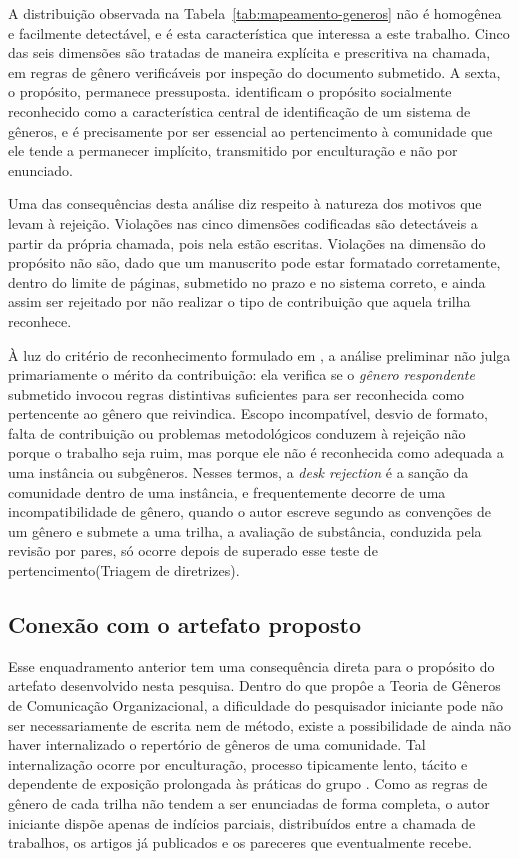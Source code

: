 A distribuição observada na Tabela~\ref{tab:mapeamento-generos} não é homogênea e facilmente detectável, e é esta característica que interessa a este trabalho. Cinco das seis dimensões são tratadas de maneira explícita e prescritiva na chamada, em regras de gênero verificáveis por inspeção do documento submetido. A sexta, o propósito, permanece pressuposta. \citeauthor{GenreSystems} identificam o propósito socialmente reconhecido como a característica central de identificação de um sistema de gêneros, e é precisamente por ser essencial ao pertencimento à comunidade que ele tende a permanecer implícito, transmitido por enculturação e não por enunciado.
 
Uma das consequências desta análise diz respeito à natureza dos motivos que levam à rejeição. Violações nas cinco dimensões codificadas são detectáveis a partir da própria chamada, pois nela estão escritas. Violações na dimensão do propósito não são, dado que um manuscrito pode estar formatado corretamente, dentro do limite de páginas, submetido no prazo e no sistema correto, e ainda assim ser rejeitado por não realizar o tipo de contribuição que aquela trilha reconhece. 

 À luz do critério de reconhecimento formulado em \cite{GenresOrgComm}, a análise preliminar não julga primariamente o mérito da contribuição: ela verifica se o \emph{gênero respondente} submetido invocou regras distintivas suficientes para ser reconhecida como pertencente ao gênero que reivindica. Escopo incompatível, desvio de formato, falta de contribuição ou problemas metodológicos conduzem à rejeição não porque o trabalho seja ruim, mas porque ele não é reconhecida como adequada a uma instância ou subgêneros. Nesses termos, a \emph{desk rejection} é a sanção da comunidade dentro de uma instância, e frequentemente decorre de uma incompatibilidade de gênero, quando o autor escreve segundo as convenções de um gênero e submete a uma trilha, a avaliação de substância, conduzida pela revisão por pares, só ocorre depois de superado esse teste de pertencimento(Triagem de diretrizes).


\subsection{Conexão com o artefato proposto}

Esse enquadramento anterior tem uma consequência direta para o propósito do artefato desenvolvido nesta pesquisa. Dentro do que propôe a Teoria de Gêneros de Comunicação Organizacional, a dificuldade do pesquisador iniciante pode não ser necessariamente de escrita nem de método, existe a possibilidade de ainda não haver internalizado o repertório de gêneros de uma comunidade. Tal internalização ocorre por enculturação, processo tipicamente lento, tácito e dependente de exposição prolongada às práticas do grupo \cite{GenreRepertoire}. Como as regras de gênero de cada trilha não tendem a ser enunciadas de forma completa, o autor iniciante dispõe apenas de indícios parciais, distribuídos entre a chamada de trabalhos, os artigos já publicados e os pareceres que eventualmente recebe.

